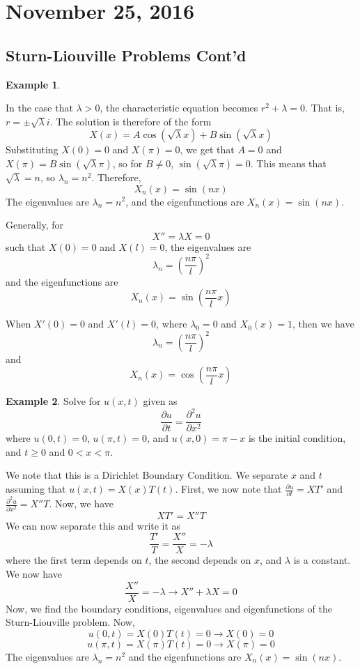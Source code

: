 \documentclass[11pt]{article}
\theoremstyle{plain} %
\theoremstyle{definition}
\theoremstyle{example}
\newtheorem*{example}{Example}
\theoremstyle{remark}
\begin{document}
\section{November 25, 2016}
\subsection{Sturn-Liouville Problems Cont'd}

\begin{example}
\end{example}

In the case that  $\lambda > 0$, the characteristic equation becomes $r^2 + \lambda = 0$. That is, $r = \pm \sqrt{\lambda}i$. The solution is therefore of the form $$X(x) = A\cos(\sqrt{\lambda}x) + B\sin(\sqrt{\lambda} x)$$
Substituting $X(0) = 0$ and $X(\pi) = 0$, we get that $A = 0$ and $X(\pi) = B\sin(\sqrt{\lambda}\pi)$, so for $B \neq 0$, $\sin(\sqrt{\lambda}\pi) = 0$. This means that $\sqrt{\lambda} =n$, so $\lambda_n = n^2$. Therefore, $$X_n(x) = \sin(nx)$$ The eigenvalues are $\lambda_n = n^2$, and the eigenfunctions are $X_n(x) = \sin(nx)$.

Generally, for $$X'' = \lambda X = 0$$ such that $X(0) = 0$ and $X(l) = 0$, the eigenvalues are $$\lambda_n = \left(\frac{n\pi}{l}\right)^2$$ and the eigenfunctions are $$X_n(x) = \sin\left(\frac{n\pi}{l}x\right)$$

When $X'(0) = 0$ and $X'(l) = 0$, where $\lambda_0 = 0$ and $X_0(x) = 1$, then we have 
$$\lambda_n = \left(\frac{n\pi}{l}\right)^2$$ and $$X_n(x) = \cos\left(\frac{n\pi}{l}x\right)$$


\begin{example}
Solve for $u(x,t)$ given as 
$$\frac{\partial u}{\partial t} = \frac{\partial^2 u}{\partial x^2}$$
where $u(0,t) = 0$, $u(\pi, t) = 0$, and $u(x,0) = \pi - x$ is the initial condition, and $t \geq 0$ and $0 < x < \pi$. 
\end{example}

We note that this is a Dirichlet Boundary Condition. We separate $x$ and $t$ assuming that $u(x,t) = X(x) T(t)$.
First, we now note that $\frac{\partial u}{\partial t} = XT'$ and $\frac{\partial^2 u}{\partial x^2} = X''T$. Now, we have $$XT' = X''T$$ We can now separate this and write it as $$\frac{T'}{T} = \frac{X''}{X} = -\lambda$$ where the first term depends on $t$, the second depends on $x$, and $\lambda$ is a constant. We now have $$\frac{X''}{X} = -\lambda \rightarrow X'' + \lambda X = 0$$
Now, we find the boundary conditions, eigenvalues and eigenfunctions of the Sturn-Liouville problem. Now, $$u(0,t) = X(0)T(t) = 0 \rightarrow X(0) = 0$$
$$u(\pi, t) = X(\pi) T(t) = 0 \rightarrow X(\pi) = 0$$
The eigenvalues are $\lambda_n = n^2$ and the eigenfunctions are $X_n(x) = \sin(nx)$.
\end{document}
